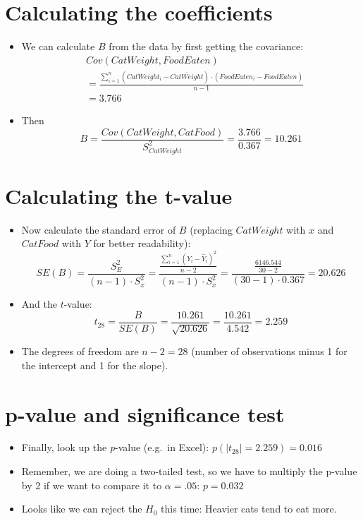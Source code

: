 \documentclass[]{article}
\providecommand{\tightlist}{%
  \setlength{\itemsep}{0pt}\setlength{\parskip}{0pt}}
\begin{document}
\section{Calculating the
coefficients}\label{calculating-the-coefficients}

\begin{itemize}
\item
  We can calculate \(B\) from the data by first getting the covariance:
  \[
  \begin{aligned}
  &Cov(CatWeight,FoodEaten) \\ &= \frac{\sum\limits_{i = 1}^n {(CatWeight_i - \overline{CatWeight})\cdot(FoodEaten_i - \overline{FoodEaten})}}{n-1} \\ &= 3.766
  \end{aligned}\]
\item
  Then
  \[B = \frac{Cov(CatWeight, CatFood)}{S_{CatWeight}^2} = \frac{3.766}{0.367} = 10.261\]
\end{itemize}

\section{Calculating the t-value}\label{calculating-the-t-value-1}

\begin{itemize}
\tightlist
\item
  Now calculate the standard error of \(B\) (replacing \(CatWeight\)
  with \(x\) and \(CatFood\) with \(Y\) for better readability):
  \[SE(B) = \frac{S_E^2}{(n-1)\cdot S^2_{x}} = \frac{\frac{\sum\limits_{i = 1}^{n} (Y_i - \hat{Y}_i)^2}{n-2}}{(n-1)\cdot S^2_{x}} = \frac{\frac{6146.544}{30 - 2}}{(30 - 1)\cdot 0.367} = 20.626\]
\item
  And the \(t\)-value:
  \[t_{28} = \frac{B}{SE(B)} = \frac{10.261}{\sqrt{20.626}} = \frac{10.261}{4.542} = 2.259\]
\item
  The degrees of freedom are \(n-2=28\) (number of observations minus 1
  for the intercept and 1 for the slope).
\end{itemize}

\section{p-value and significance
test}\label{p-value-and-significance-test}

\begin{itemize}
\tightlist
\item
  Finally, look up the \emph{p}-value (e.g.~in Excel):
  \(p(|t_{28}| = 2.259) = 0.016\)
\item
  Remember, we are doing a two-tailed test, so we have to multiply the
  p-value by 2 if we want to compare it to \(\alpha = .05\):
  \(p =0.032\)
\item
  Looks like we can reject the \(H_0\) this time: Heavier cats tend to
  eat more.
\end{itemize}
\end{document}
